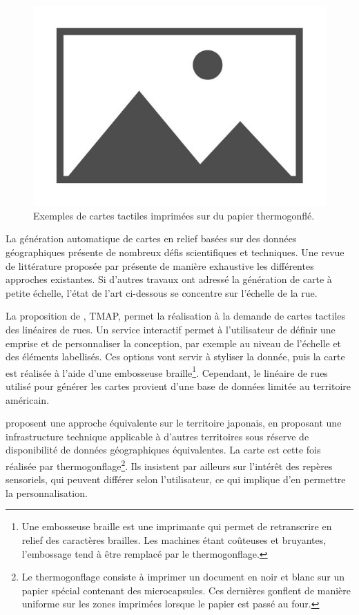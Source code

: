 \begin{figure}
    \centering
    \includegraphics{images/placeholder.jpg}
    \caption{Exemples de cartes tactiles imprimées sur du papier thermogonflé.}
    \label{fig:excartestactiles}
\end{figure}

\newpar{}

La génération automatique de cartes en relief basées sur des données géographiques présente de nombreux défis scientifiques et techniques. Une revue de littérature proposée par \cite{Wabinski2019} présente de manière exhaustive les différentes approches existantes. Si d'autres travaux ont adressé la génération de carte à petite échelle, l'état de l'art ci-dessous se concentre sur l'échelle de la rue.

La proposition de \cite{Miele2004}, TMAP, permet la réalisation à la demande de cartes tactiles des linéaires de rues. Un service interactif permet à l'utilisateur de définir une emprise et de personnaliser la conception, par exemple au niveau de l'échelle et des éléments labellisés. Ces options vont servir à styliser la donnée, puis la carte est réalisée à l'aide d'une embosseuse braille\footnote{Une embosseuse braille est une imprimante qui permet de retranscrire en relief des caractères brailles. Les machines étant coûteuses et bruyantes, l'embossage tend à être remplacé par le thermogonflage.}. Cependant, le linéaire de rues utilisé pour générer les cartes provient d'une base de données limitée au territoire américain. 

\cite{Minatani2010} proposent une approche équivalente sur le territoire japonais, en proposant une infrastructure technique applicable à d'autres territoires sous réserve de disponibilité de données géographiques équivalentes. La carte est cette fois réalisée par thermogonflage\footnote{Le thermogonflage consiste à imprimer un document en noir et blanc sur un papier spécial contenant des microcapsules. Ces dernières gonflent de manière uniforme sur les zones imprimées lorsque le papier est passé au four.}. Ils insistent par ailleurs sur l'intérêt des repères sensoriels, qui peuvent différer selon l'utilisateur, ce qui implique d'en permettre la personnalisation. 

